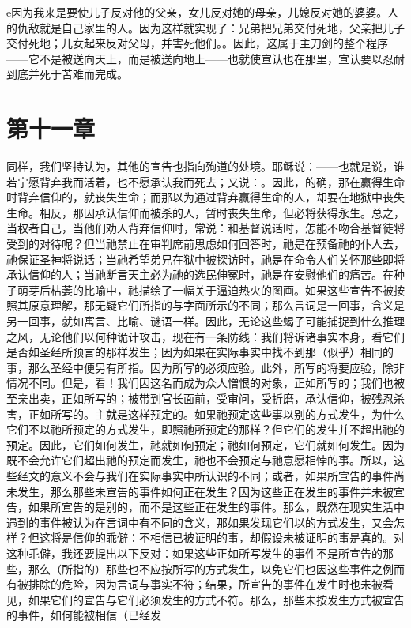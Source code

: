 e{因为我来是要使儿子反对他的父亲，女儿反对她的母亲，儿媳反对她的婆婆。人的仇敌就是自己家里的人。}因为这样就实现了：兄弟把兄弟交付死地，父亲把儿子交付死地；儿女起来反对父母，并害死他们。。因此，这属于主刀剑的整个程序——它不是被送向天上，而是被送向地上——也就使宣认也在那里，宣认要以忍耐到底并死于苦难而完成。\par


\section{第十一章}

同样，我们坚持认为，其他的宣告也指向殉道的处境。耶稣说：——也就是说，谁若宁愿背弃我而活着，也不愿承认我而死去；又说：。因此，的确，那在赢得生命时背弃信仰的，就丧失生命；而那以为通过背弃赢得生命的人，却要在地狱中丧失生命。相反，那因承认信仰而被杀的人，暂时丧失生命，但必将获得永生。总之，当权者自己，当他们劝人背弃信仰时，常说：和基督说话时，怎能不吻合基督徒将受到的对待呢？但当祂禁止在审判席前思虑如何回答时，祂是在预备祂的仆人去，祂保证圣神将说话；当祂希望弟兄在狱中被探访时，祂是在命令人们关怀那些即将承认信仰的人；当祂断言天主必为祂的选民伸冤时，祂是在安慰他们的痛苦。在种子萌芽后枯萎的比喻中，祂描绘了一幅关于逼迫热火的图画。如果这些宣告不被按照其原意理解，那无疑它们所指的与字面所示的不同；那么言词是一回事，含义是另一回事，就如寓言、比喻、谜语一样。因此，无论这些蝎子可能捕捉到什么推理之风，无论他们以何种诡计攻击，现在有一条防线：我们将诉诸事实本身，看它们是否如圣经所预言的那样发生；因为如果在实际事实中找不到那（似乎）相同的事，那么圣经中便另有所指。因为所写的必须应验。此外，所写的将要应验，除非情况不同。但是，看！我们因这名而成为众人憎恨的对象，正如所写的；我们也被至亲出卖，正如所写的；被带到官长面前，受审问，受折磨，承认信仰，被残忍杀害，正如所写的。主就是这样预定的。如果祂预定这些事以别的方式发生，为什么它们不以祂所预定的方式发生，即照祂所预定的那样？但它们的发生并不超出祂的预定。因此，它们如何发生，祂就如何预定；祂如何预定，它们就如何发生。因为既不会允许它们超出祂的预定而发生，祂也不会预定与祂意愿相悖的事。所以，这些经文的意义不会与我们在实际事实中所认识的不同；或者，如果所宣告的事件尚未发生，那么那些未宣告的事件如何正在发生？因为这些正在发生的事件并未被宣告，如果所宣告的是别的，而不是这些正在发生的事件。那么，既然在现实生活中遇到的事件被认为在言词中有不同的含义，那如果发现它们以的方式发生，又会怎样？但这将是信仰的乖僻：不相信已被证明的事，却假设未被证明的事是真的。对这种乖僻，我还要提出以下反对：如果这些正如所写发生的事件不是所宣告的那些，那么（所指的）那些也不应按所写的方式发生，以免它们也因这些事件之例而有被排除的危险，因为言词与事实不符；结果，所宣告的事件在发生时也未被看见，如果它们的宣告与它们必须发生的方式不符。那么，那些未按发生方式被宣告的事件，如何能被相信（已经发